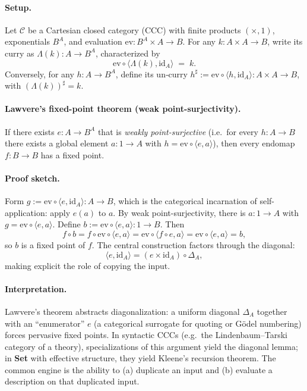 \documentclass[11pt]{article}
\theoremstyle{upright}
\begin{document}
\paragraph{Setup.}
Let $\mathcal{C}$ be a Cartesian closed category (CCC) with finite products $(\times, 1)$, exponentials $B^A$, and evaluation $\mathrm{ev}: B^A \times A \to B$. For any $k: A \times A \to B$, write its curry as $\Lambda(k): A \to B^A$, characterized by
\[
\mathrm{ev} \circ \langle \Lambda(k), \mathrm{id}_A \rangle \;=\; k.
\]
Conversely, for any $h: A \to B^A$, define its un‑curry $h^\sharp := \mathrm{ev}\circ\langle h, \mathrm{id}_A\rangle : A \times A \to B$, with $(\Lambda(k))^\sharp = k$.

\paragraph{Lawvere’s fixed-point theorem (weak point-surjectivity).}
If there exists $e : A \to B^A$ that is \emph{weakly point-surjective} (i.e.\ for every $h : A \to B$ there exists a global element $a:1\to A$ with $h = \mathrm{ev}\circ\langle e, a\rangle$), then every endomap $f : B \to B$ has a fixed point.

\paragraph{Proof sketch.}
Form $g := \mathrm{ev} \circ \langle e, \mathrm{id}_A \rangle : A \to B$, which is the categorical incarnation of self-application: apply $e(a)$ to $a$. By weak point-surjectivity, there is $a:1\to A$ with $g = \mathrm{ev}\circ \langle e, a\rangle$. Define $b := \mathrm{ev}\circ \langle e, a\rangle : 1 \to B$. Then
\[
f \circ b
= f \circ \mathrm{ev}\circ \langle e, a\rangle
= \mathrm{ev}\circ \langle f \circ e, a\rangle
= \mathrm{ev}\circ \langle e, a\rangle
= b,
\]
so $b$ is a fixed point of $f$. The central construction factors through the diagonal:
\[
\langle e, \mathrm{id}_A \rangle
= (e \times \mathrm{id}_A) \circ \Delta_A,
\]
making explicit the role of copying the input.

\paragraph{Interpretation.}
Lawvere’s theorem abstracts diagonalization: a uniform diagonal $\Delta_A$ together with an ``enumerator'' $e$ (a categorical surrogate for quoting or Gödel numbering) forces pervasive fixed points. In syntactic CCCs (e.g.\ the Lindenbaum--Tarski category of a theory), specializations of this argument yield the diagonal lemma; in \textbf{Set} with effective structure, they yield Kleene’s recursion theorem. The common engine is the ability to (a) duplicate an input and (b) evaluate a description on that duplicated input.
\end{document}
